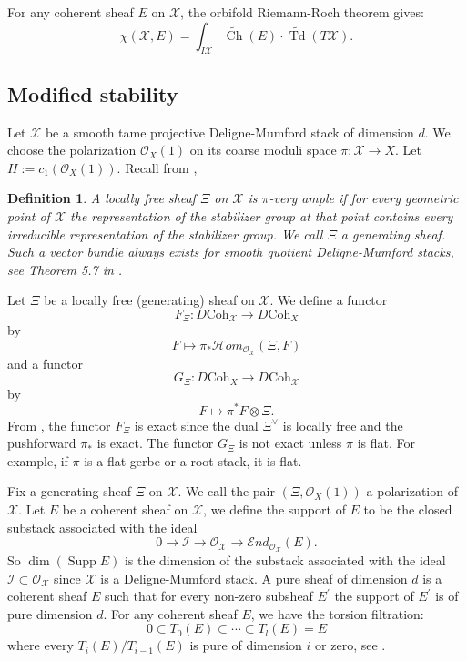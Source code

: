 \documentclass[10pt]{amsart}
\newtheorem{defn}[prop]{Definition}
\newcommand{\sI}{{\mathcal I}}
\newcommand{\sO}{{\mathcal O}}
\newcommand{\sX}{{\mathcal X}}
\newcommand{\Coh}{\mbox{Coh}}
\newcommand{\cEnd}{\mathscr{E}nd}
\newcommand{\cHom}{\mathscr{H}om}
\DeclareMathOperator{\Ch}{Ch}
\DeclareMathOperator{\Supp}{Supp}
\DeclareMathOperator{\Td}{Td}
\numberwithin{equation}{subsection}
\begin{document}
For any coherent sheaf $E$ on $\sX$, the orbifold Riemann-Roch theorem \cite[Theorem 5.4]{Toe} gives:
\begin{equation}\label{eqn_orbifold_RR}
\chi(\sX, E)=\int_{I\sX}\widetilde{\Ch}(E)\cdot \widetilde{\Td}(T\sX).
\end{equation}


\subsection{Modified stability}

Let $\sX$ be a smooth tame projective Deligne-Mumford stack of dimension $d$.  We  choose the polarization $\sO_X(1)$ on its coarse moduli space $\pi: \sX\to X$.
Let $H:=c_1(\sO_X(1))$.
Recall from \cite[\S 2]{Nir}, 

\begin{defn}\label{defn_generating_sheaf}
A locally free sheaf $\Xi$ on $\sX$ is $\pi$-very ample if  for every geometric point of $\sX$ the representation of the stabilizer group at that point contains every irreducible representation of the stabilizer group.  We call $\Xi$ a generating sheaf. Such a vector bundle always exists for smooth quotient Deligne-Mumford stacks, see Theorem 5.7 in \cite{OS}.
\end{defn}

Let $\Xi$ be a locally free (generating) sheaf  on $\sX$. We define a functor
$$F_{\Xi}: D\Coh_{\sX}\to D\Coh_{X}$$ by
$$F\mapsto \pi_*\cHom_{\sO_\sX}(\Xi, F)$$
and a functor 
$$G_{\Xi}: D\Coh_{X}\to D\Coh_{\sX}$$ by
$$F\mapsto \pi^*F\otimes \Xi.$$
From \cite[\S 5]{OS}, the functor $F_{\Xi}$ is exact since the dual $\Xi^{\vee}$ is locally free and the pushforward $\pi_*$ is exact.  The functor $G_{\Xi}$ is not exact unless $\pi$ is flat. For example, if $\pi$ is a flat gerbe or a root stack, it is flat. 


Fix a generating sheaf $\Xi$ on $\sX$. We call the pair $(\Xi, \sO_X(1))$ a polarization of $\sX$. 
Let $E$ be a coherent sheaf on $\sX$, we define the support of $E$ to be the closed substack associated with the ideal
$$0\to \sI\to \sO_{\sX}\to \cEnd_{\sO_{\sX}}(E).$$
So $\dim(\Supp E)$ is the dimension of the substack associated with the ideal $\sI\subset \sO_{\sX}$ since $\sX$ is a Deligne-Mumford stack. 
A pure sheaf of dimension $d$ is a coherent sheaf $E$ such that for every non-zero subsheaf $E^\prime$ the support of $E^\prime$ is of pure dimension $d$. 
For any coherent sheaf $E$, we have the torsion filtration:
$$0\subset T_0(E)\subset \cdots \subset T_l(E)=E$$
where every $T_i(E)/T_{i-1}(E)$ is pure of dimension $i$ or zero, see \cite[\S 1.1.4]{HL}.
\end{document}
